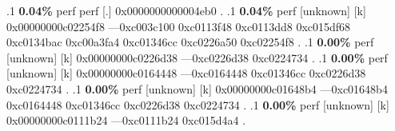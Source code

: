 \begin{profile}
{.1 \textbf{ 0.04\%} perf             perf                   [.] 0x0000000000004eb0\newline {} . 
.1 \textbf{ 0.04\%} perf             [unknown]              [k] 0x00000000c02254f8\newline {} ---0xc003c100\newline {} 0xc0113f48\newline {} 0xc0113dd8\newline {} 0xc015df68\newline {} 0xc0134bac\newline {} 0xc00a3fa4\newline {} 0xc01346cc\newline {} 0xc0226a50\newline {} 0xc02254f8\newline {} . 
.1 \textbf{ 0.00\%} perf             [unknown]              [k] 0x00000000c0226d38\newline {} ---0xc0226d38\newline {} 0xc0224734\newline {} . 
.1 \textbf{ 0.00\%} perf             [unknown]              [k] 0x00000000c0164448\newline {} ---0xc0164448\newline {} 0xc01346cc\newline {} 0xc0226d38\newline {} 0xc0224734\newline {} . 
.1 \textbf{ 0.00\%} perf             [unknown]              [k] 0x00000000c01648b4\newline {} ---0xc01648b4\newline {} 0xc0164448\newline {} 0xc01346cc\newline {} 0xc0226d38\newline {} 0xc0224734\newline {} . 
.1 \textbf{ 0.00\%} perf             [unknown]              [k] 0x00000000c0111b24\newline {} ---0xc0111b24\newline {} 0xc015d4a4\newline {} . 
}
\end{profile}

